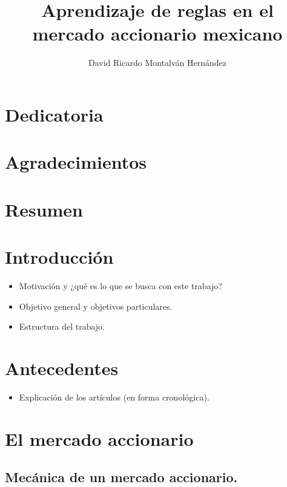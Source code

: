 \documentclass[onesided, 12pt]{scrbook}
\title{Aprendizaje de reglas en el mercado accionario mexicano}
\date{}
\author{David Ricardo Montalván Hernández}
\theoremstyle{break}
\begin{document}
\maketitle
{} %
\renewcommand{\contentsname}{Contenido}
\tableofcontents
\renewcommand{\listfigurename}{Lista de imágenes}
\listoffigures
\renewcommand{\listtablename}{Lista de tablas}
\listoftables
\chapter*{Dedicatoria}
\chapter*{Agradecimientos}
\chapter*{Resumen}


\chapter{Introducción}
\begin{itemize}
\item Motivación y ¿qué es lo que se busca con este trabajo?
\item Objetivo general y objetivos particulares.
\item Estructura del trabajo.
\end{itemize}

\chapter{Antecedentes}
\begin{itemize}
\item Explicación de los artículos (en forma cronológica).
\end{itemize}

\chapter{El mercado accionario}

\section{Mecánica de un mercado accionario.}
\end{document}
